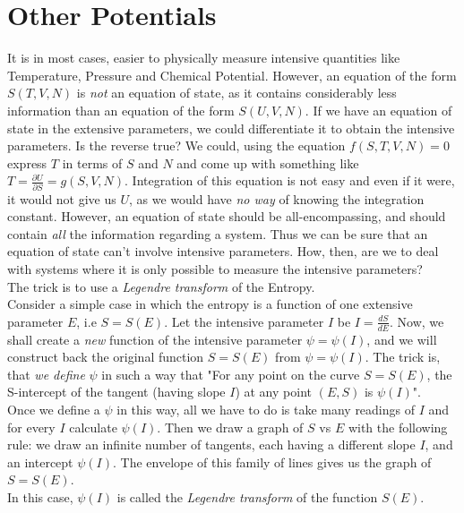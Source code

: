\documentclass[oneside]{book}
\begin{document}
\section{Other Potentials}
It is in most cases, easier to physically measure intensive quantities like Temperature, Pressure and Chemical Potential. However, an equation of the form $S(T,V,N)$ is \emph{not} an equation of state, as it contains considerably less information than an equation of the form $S(U,V,N)$. If we have an equation of state in the extensive parameters, we could differentiate it to obtain the intensive parameters. Is the reverse true? We could, using the equation $f(S,T,V,N) = 0$ express $T$ in terms of $S$ and $N$ and come up with something like  $T = \frac{\partial U}{\partial S} = g(S,V,N)$. Integration of this equation is not easy and even if it were, it would not give us $U$, as we would have \emph{no way} of knowing the integration constant. However, an equation of state should be all-encompassing, and should contain \emph{all} the information regarding a system. Thus we can be sure that an equation of state can't involve intensive parameters. How, then, are we to deal with systems where it is only possible to measure the intensive parameters?\\

The trick is to use a \emph{Legendre transform} of the Entropy.\\

Consider a simple case in which the entropy is a function of one extensive parameter $E$, i.e $S = S(E)$. Let the intensive parameter $I$ be $I = \frac{dS}{dE}$. Now, we shall create a \emph{new} function of the intensive parameter $\psi = \psi(I)$, and we will construct back the original function $S = S(E)$ from $\psi = \psi(I)$. The trick is, that \emph{we define} $\psi$ in such a way that "For any point on the curve $S = S(E)$, the S-intercept of the tangent (having slope $I$) at any point $(E,S)$ is $\psi(I)$".\\

Once we define a $\psi$ in this way, all we have to do is take many readings of $I$ and for every $I$ calculate $\psi(I)$. Then we draw a graph of $S$ vs $E$ with the following rule: we draw an infinite number of tangents, each having a different slope $I$, and an intercept $\psi(I)$. The envelope of this family of lines gives us the graph of $S = S(E)$.\\

In this case, $\psi(I)$ is called the \emph{Legendre transform} of the function $S(E)$.\\
\end{document}
